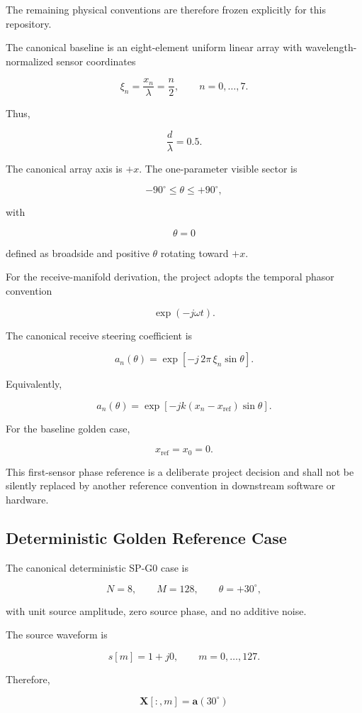 The remaining physical conventions are therefore frozen explicitly for this
repository.

The canonical baseline is an eight-element uniform linear array with
wavelength-normalized sensor coordinates

\[
\xi_n
=
\frac{x_n}{\lambda}
=
\frac{n}{2},
\qquad
n=0,\ldots,7.
\]

Thus,

\[
\frac{d}{\lambda}=0.5.
\]

The canonical array axis is \(+x\). The one-parameter visible sector is

\[
-90^\circ
\leq
\theta
\leq
+90^\circ,
\]

with

\[
\theta=0
\]

defined as broadside and positive \(\theta\) rotating toward \(+x\).

For the receive-manifold derivation, the project adopts the temporal phasor
convention

\[
\exp(-j\omega t).
\]

The canonical receive steering coefficient is

\[
a_n(\theta)
=
\exp\!\left[
-j\,2\pi\,\xi_n\sin\theta
\right].
\]

Equivalently,

\[
a_n(\theta)
=
\exp\!\left[
-jk(x_n-x_{\mathrm{ref}})\sin\theta
\right].
\]

For the baseline golden case,

\[
x_{\mathrm{ref}}=x_0=0.
\]

This first-sensor phase reference is a deliberate project decision and shall
not be silently replaced by another reference convention in downstream
software or hardware.

\subsection{Deterministic Golden Reference Case}

The canonical deterministic SP-G0 case is

\[
N=8,
\qquad
M=128,
\qquad
\theta=+30^\circ,
\]

with unit source amplitude, zero source phase, and no additive noise.

The source waveform is

\[
s[m]=1+j0,
\qquad
m=0,\ldots,127.
\]

Therefore,

\[
\mathbf X[:,m]
=
\mathbf a(30^\circ)
\]

